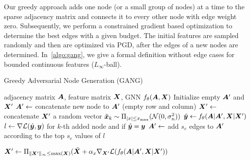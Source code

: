 \documentclass{article} %
\newcommand{\adj}{\mA}
\newcommand{\features}{\mX}
\newcommand{\todo}[1]{\textcolor{red}{(Todo: #1)}}
\begin{document}
Our greedy approach adds one node (or a small group of nodes) at a time to the sparse adjacency matrix and connects it to every other node with edge weight zero. Subsequently, we perform a constrained gradient based optimization to determine the best edges with a given budget. 
The initial features are sampled randomly and then are optimized via PGD, after the edges of a new nodes are determined. In~\autoref{algo:gang}, we give a formal definition without edge cases for bounded continuous features (\(L_\infty\)-ball).

\begin{algorithm}[h]
	\caption{Greedy Adversarial Node Generation (GANG)}
	\label{algo:gang}
	\begin{algorithmic}
		 adjacency matrix \(\adj\), feature matrix \(\features\), GNN \(f_{\theta}(\adj, \features)\)
		\STATE Initialize empty \(\adj^\prime\) and \(\features^\prime\)
		\STATE \(\adj^\prime \leftarrow\) concatenate new node to \(\adj^\prime\) (empty row and column)
		\STATE \(\features^\prime \leftarrow\) concatenate \(\features^\prime\) a random vector \(\tilde{{\bm{x}}}_k \sim \Pi_{|x| \le x_{\max}}(\mathcal{N}(0, \sigma_n^2))\)
		\STATE \(\hat{\vy} \leftarrow f_{\theta}(\adj | \adj^\prime, \features | \features^\prime)\)
		\STATE \(l \leftarrow \nabla \mathcal{L}(\hat{{\bm{y}}}, {\bm{y}})\) for \(k\)-th added node and if \(\hat{{\bm{y}}} = {\bm{y}}\)
		\STATE \(\adj^\prime \leftarrow\) add \(s_e\) edges to \(\adj^\prime\) according to the top \(s_e\) values of \(l\)
		\ENDFOR
						
						
		\STATE \(\features^\prime \leftarrow \Pi_{\|\features^\prime\|_\infty \le \max(\mX)}(\tilde{\features} + \alpha_x \nabla_{\features^\prime} \mathcal{L}(f_{\theta}(\adj | \adj^\prime, \features | \features^\prime))\)
		\ENDFOR
		\ENDFOR
	\end{algorithmic}
\end{algorithm}
\end{document}
